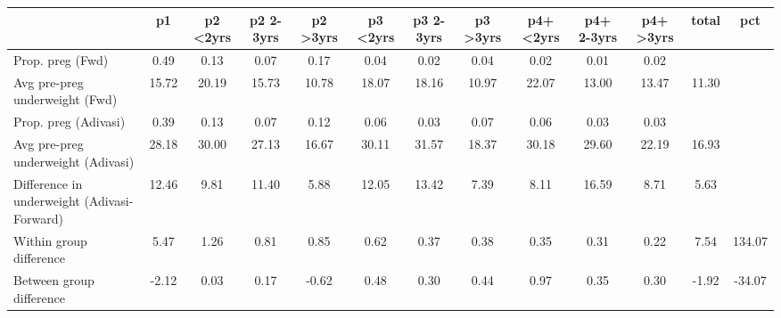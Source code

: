 \begin{tabular}{l*{12}{c}}
\toprule
            &\multicolumn{1}{c}{p1}&\multicolumn{1}{c}{p2 \textless2yrs}&\multicolumn{1}{c}{p2 2-3yrs}&\multicolumn{1}{c}{p2 \textgreater3yrs}&\multicolumn{1}{c}{p3 \textless2yrs}&\multicolumn{1}{c}{p3 2-3yrs}&\multicolumn{1}{c}{p3 \textgreater3yrs}&\multicolumn{1}{c}{p4+ \textless2yrs}&\multicolumn{1}{c}{p4+ 2-3yrs}&\multicolumn{1}{c}{p4+ \textgreater3yrs}&\multicolumn{1}{c}{total}&\multicolumn{1}{c}{pct}\\
\midrule
\midrule
Prop. preg (Fwd)&        0.49&        0.13&        0.07&        0.17&        0.04&        0.02&        0.04&        0.02&        0.01&        0.02&            &            \\
Avg pre-preg underweight (Fwd)&       15.72&       20.19&       15.73&       10.78&       18.07&       18.16&       10.97&       22.07&       13.00&       13.47&       11.30&            \\
Prop. preg (Adivasi)&        0.39&        0.13&        0.07&        0.12&        0.06&        0.03&        0.07&        0.06&        0.03&        0.03&            &            \\
Avg pre-preg underweight (Adivasi)&       28.18&       30.00&       27.13&       16.67&       30.11&       31.57&       18.37&       30.18&       29.60&       22.19&       16.93&            \\
Difference in underweight (Adivasi-Forward)&       12.46&        9.81&       11.40&        5.88&       12.05&       13.42&        7.39&        8.11&       16.59&        8.71&        5.63&            \\
Within group difference&        5.47&        1.26&        0.81&        0.85&        0.62&        0.37&        0.38&        0.35&        0.31&        0.22&        7.54&      134.07\\
Between group difference&       -2.12&        0.03&        0.17&       -0.62&        0.48&        0.30&        0.44&        0.97&        0.35&        0.30&       -1.92&      -34.07\\
\bottomrule
\end{tabular}
